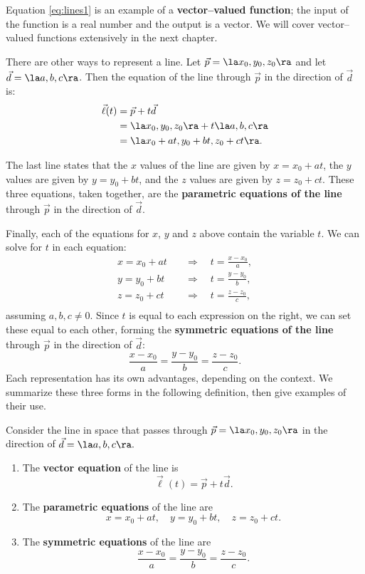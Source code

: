 Equation \eqref{eq:lines1} is an example of a \textbf{vector--valued function}; the input of the function is a real number and the output is a vector. We will cover vector--valued functions extensively in the next chapter.

There are other ways to represent a line. Let $\vec p = \la x_0,y_0,z_0\ra$ and let $\vec d = \la a,b,c\ra$. Then the equation of the line through $\vec p$ in the direction of $\vec d$ is:
\begin{align*}
\vec\ell(t) &= \vec p + t\vec d \\
						&= \la x_0,y_0,z_0\ra + t\la a,b,c\ra \\
						&= \la x_0 + at, y_0+bt, z_0+ct\ra.
\end{align*}

The last line states that the $x$ values of the line are given by $x=x_0+at$, the $y$ values are given by $y = y_0+bt$, and the $z$ values are given by $z = z_0 + ct$. These three equations, taken together, are the \textbf{parametric equations of the line} through $\vec p$ in the direction of $\vec d$.

Finally, each of the equations for $x$, $y$ and $z$ above contain the variable $t$. We can solve for $t$ in each equation:
\begin{align*}
x = x_0+at \quad&\Rightarrow\quad t=\frac{x-x_0}{a},\\
y=y_0+bt \quad&\Rightarrow\quad t = \frac{y-y_0}{b},\\
z = z_0+ct \quad&\Rightarrow\quad t = \frac{z-z_0}{c},\\
\end{align*}
assuming $a,b,c\neq 0$.
Since $t$ is equal to each expression on the right, we can set these equal to each other, forming the \textbf{symmetric equations of the line} through $\vec p$ in the direction of $\vec d$:
$$\frac{x-x_0}{a} = \frac{y-y_0}{b}=\frac{z-z_0}{c}.$$
Each representation has its own advantages, depending on the context. We summarize these three forms in the following definition, then give examples of their use.
\clearpage

{Consider the line in space that passes through $\vec p = \la x_0,y_0,z_0\ra$ in the direction of $\vec d = \la a,b,c\ra.$
\begin{enumerate}
	\item The \textbf{vector equation} of the line is $$\vec \ell(t) = \vec p+t\vec d.$$
	\item	The \textbf{parametric equations} of the line are
	$$x = x_0+at, \quad y=y_0+bt, \quad z = z_0+ct .$$
	\item	The \textbf{symmetric equations} of the line are
	$$\frac{x-x_0}{a} = \frac{y-y_0}{b}=\frac{z-z_0}{c}.$$
\end{enumerate}
}

